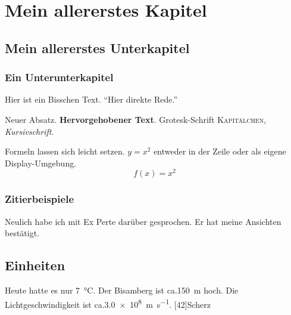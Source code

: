 \chapter{Mein allererstes Kapitel}
\section{Mein allererstes Unterkapitel}
\subsection{Ein Unterunterkapitel}

Hier ist ein Bisschen    
 {\Huge Text}. "`Hier direkte Rede."'
 
Neuer Absatz. \textbf{Hervorgehobener Text}. \textsf{Grotesk-Schrift}
\textsc{Kapitälchen}, \textit{Kursivschrift}.

Formeln lassen sich leicht setzen. $y=x^2$ entweder in der Zeile oder als
eigene Display-Umgebung.
\begin{equation}
f(x)=x^2
\end{equation}

\subsection{Zitierbeispiele}
Neulich habe ich mit Ex Perte darüber gesprochen. Er hat meine Ansichten
bestätigt.


\section{Einheiten}
Heute hatte es nur \SI{7}{\celsius}. Der Bisamberg ist ca.\@ \SI{150}{\meter}
hoch. Die Lichtgeschwindigkeit ist ca.\@ \SI{3.0e8}{\meter\per\second}.
[42]{Scherz}


